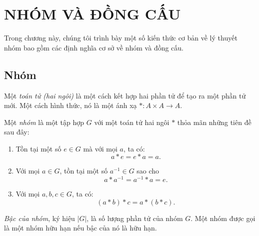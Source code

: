 \chapter{NHÓM VÀ ĐỒNG CẤU} 

Trong chương này, chúng tôi trình bày một số kiến thức cơ bản về lý thuyết nhóm bao gồm các định nghĩa cơ sở về nhóm và đồng cấu.

\section{Nhóm}

\begin{defi}[Toán tử hai ngôi]
  Một \emph{toán tử (hai ngôi)} là một cách kết hợp hai phần tử để tạo ra một phần tử mới. Một cách hình thức, nó là một ánh xạ $*: A \times A \rightarrow A$.
\end{defi}

\begin{defi}[Nhóm]
  Một \emph{nhóm} là một tập hợp $G$ với một toán tử hai ngôi $*$ thỏa mãn những tiên đề sau đây:
  \begin{enumerate}[label=\arabic{*}.]
    \item Tồn tại một số $e \in G$ mà với mọi $a$, ta có:
      \[
        a*e = e*a = a.\tag{đơn vị - identity}
      \]
    \item Với mọi $a \in G$, tồn tại một số $a^{-1} \in G$ sao cho
      \[
        a*a^{-1} = a^{-1}*a = e.\tag{nghịch đảo - inverse}
      \]
    \item Với mọi $a, b, c\in G$, ta có:
      \[
        (a*b)*c = a*(b*c).\tag{kết hợp - associativity}
      \]
  \end{enumerate}
\end{defi}

\begin{defi}
  \emph{Bậc của nhóm}, ký hiệu $|G|$, là số lượng phần tử của nhóm $G$. Một nhóm được gọi là một nhóm hữu hạn nếu bậc của nó là hữu hạn.
\end{defi}

